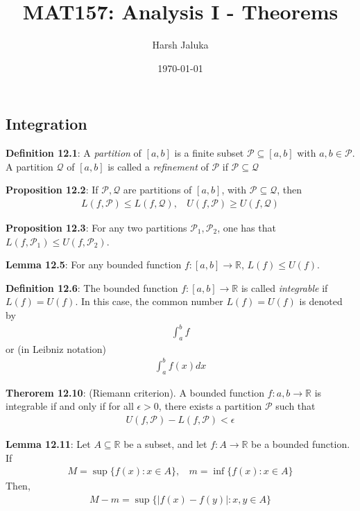 \documentclass[11pt]{article}
\title{MAT157: Analysis I - Theorems}
\author{Harsh Jaluka}
\date{\today}
\begin{document}
\begin{titlepage}
\maketitle 
\end{titlepage}


\newpage
\begin{center}
    \section*{Integration}
\end{center}


\textbf{Definition 12.1}: A \textit{partition} of $[a,b]$ is a finite subset $\mathcal{P} \subseteq [a, b]$ with $a, b \in \mathcal{P}$. A partition $\mathcal{Q}$ of $[a,b]$ is called a \textit{refinement} of $\mathcal{P}$ if $\mathcal{P} \subseteq \mathcal{Q}$

\textbf{Proposition 12.2}: If $\mathcal{P}, \mathcal{Q}$ are partitions of $[a, b]$, with $\mathcal{P} \subseteq \mathcal{Q}$, then 
\begin{align*}
    L(f, \mathcal{P}) \leq L(f, \mathcal{Q}), ~~~~U(f, \mathcal{P}) \geq U(f, \mathcal{Q})
\end{align*} 

\textbf{Proposition 12.3}: For any two partitions $\mathcal{P}_1, \mathcal{P}_2$, one has that $L(f, \mathcal{P}_1) \leq U(f, \mathcal{P}_2)$.

\textbf{Lemma 12.5}: For any bounded function $f: [a,b] \to \mathbb{R}$, $L(f) \leq U(f)$.

\textbf{Definition 12.6}: The bounded function $f:[a,b] \to \mathbb{R}$ is called \textit{integrable} if $L(f) = U(f)$. In this case, the common number $L(f) = U(f)$ is denoted by 
\begin{align*}
    \int_a^b f
\end{align*}
or (in Leibniz notation)
\begin{align*}
    \int_a^b f(x) dx
\end{align*} 

\textbf{Therorem 12.10}: (Riemann criterion). A bounded function $f:{a,b} \to \mathbb{R}$ is integrable if and only if for all $\epsilon > 0$, there exists a partition $\mathcal{P}$ such that
\begin{align*}
    U(f, \mathcal{P}) - L(f, \mathcal{P}) < \epsilon 
\end{align*}

\textbf{Lemma 12.11}: Let $A \subseteq \mathbb{R}$ be a subset, and let $f: A \to \mathbb{R}$ be a bounded function. If 
\begin{align*}
    M = \sup\{f(x): x \in A\}, ~~~~ m = \inf\{f(x): x \in A\}
\end{align*}
Then, 
\begin{align*}
    M - m = \sup\{|f(x) - f(y)|: x,y \in A\}
\end{align*}
\end{document}

